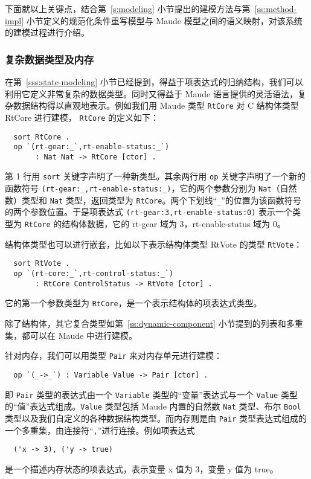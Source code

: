 下面就以上关键点，结合第~\ref{s:modeling} 小节提出的建模方法与第~\ref{ss:method-impl} 小节定义的规范化条件重写模型与 Maude 模型之间的语义映射，对该系统的建模过程进行介绍。

\subsubsection{复杂数据类型及内存}

在第~\ref{sss:state-modeling} 小节已经提到，得益于项表达式的归纳结构，我们可以利用它定义非常复杂的数据类型。同时又得益于 Maude 语言提供的灵活语法，复杂数据结构得以直观地表示。例如我们用 Maude 类型 \verb|RtCore| 对 C 结构体类型 RtCore 进行建模， \verb|RtCore| 的定义如下：
\begin{verbatim}
  sort RtCore .
  op `(rt-gear:_`,rt-enable-status:_`) 
       : Nat Nat -> RtCore [ctor] .
\end{verbatim}
第 1 行用 \verb|sort| 关键字声明了一种新类型。其余两行用 \verb|op| 关键字声明了一个新的函数符号 \verb|(rt-gear:_,rt-enable-status:_)|，它的两个参数分别为 \verb|Nat|（自然数）类型和 \verb|Nat| 类型，返回类型为 \verb|RtCore|。两个下划线“\verb|_|”的位置为该函数符号的两个参数位置。于是项表达式 \verb|(rt-gear:3,rt-enable-status:0)| 表示一个类型为 \verb|RtCore| 的结构体数据，它的 rt-gear 域为 3，rt-enable-status 域为 0。

结构体类型也可以进行嵌套，比如以下表示结构体类型 RtVote 的类型 \verb|RtVote|：
\begin{verbatim}
  sort RtVote .
  op `(rt-core:_`,rt-control-status:_`) 
       : RtCore ControlStatus -> RtVote [ctor] .
\end{verbatim}
它的第一个参数类型为 \verb|RtCore|，是一个表示结构体的项表达式类型。

除了结构体，其它复合类型如第~\ref{ss:dynamic-component} 小节提到的列表和多重集，都可以在 Maude 中进行建模。

针对内存，我们可以用类型 \verb|Pair| 来对内存单元进行建模：
\begin{verbatim}
  op `(_->_`) : Variable Value -> Pair [ctor] .
\end{verbatim}
即 \verb|Pair| 类型的表达式由一个 \verb|Variable| 类型的“变量”表达式与一个 \verb|Value| 类型的“值”表达式组成。\verb|Value| 类型包括 Maude 内置的自然数 \verb|Nat| 类型、布尔 \verb|Bool| 类型以及我们自定义的各种数据结构类型。而内存则是由 \verb|Pair| 类型表达式组成的一个多重集，由连接符“\verb|,|”进行连接。例如项表达式
\begin{verbatim}
  ('x -> 3), ('y -> true)
\end{verbatim}
是一个描述内存状态的项表达式，表示变量 x 值为 3，变量 y 值为 true。

